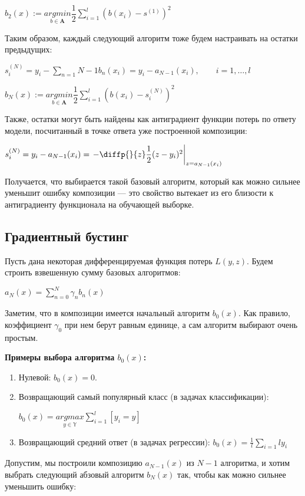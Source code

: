 \documentclass{article}
\begin{document}
$b_2(x) := \underset{b\in\mathbf{A}}{argmin} \dfrac{1}{2}\sum_{i=1}^{l}(b(x_i)-s^{(1)})^2$

Таким образом, каждый следующий алгоритм тоже будем настраивать на остатки предыдущих:

$s^{(N)}_i = y_i - \sum_{n=1}{N-1}b_n(x_i) = y_i - a_{N-1}(x_i),\qquad i=1,\ldots,l$

$b_N(x):= \underset{b\in\mathbf{A}}{argmin} \dfrac{1}{2}\sum_{i=1}^{l}(b(x_i)-s_i^{(N)})^2$

Также, остатки могут быть найдены как антиградиент функции потерь по ответу модели, посчитанный в точке ответа уже построенной композиции:

$s_i^{(N)} = y_i - a_{N-1}(x_i)= \left.- \diffp{}{z}\dfrac{1}{2}(z-y_i)^2\right|_{z=a_{N-1}(x_i)}$

Получается, что выбирается такой базовый алгоритм, который как можно сильнее уменьшит ошибку композиции — это свойство вытекает из его близости к антиградиенту функционала на обучающей выборке.

\subsection{Градиентный бустинг}

Пусть дана некоторая дифференцируемая функция потерь $L(y, z)$. Будем строить взвешенную сумму базовых алгоритмов:

$a_N(x) = \sum_{n=0}^{N}\gamma_n b_n(x)$

Заметим, что в композиции имеется начальный алгоритм $b_0(x)$. Как правило, коэффициент $\gamma_0$ при нем берут равным единице, а сам алгоритм выбирают очень простым.

\textbf{Примеры выбора алгоритма $b_0(x)$:}

\begin{enumerate}
	\item Нулевой: $b_0(x) = 0$.
	\item Возвращающий самый популярный класс (в задачах классификации):
	
	$b_0(x) = \underset{y\in\mathbf{\mathbb{Y}}}{argmax}\sum_{i=1}^{l}[y_i=y]$
	\item Возвращающий средний ответ (в задачах регрессии):	
	$b_0(x) = \frac{1}{l}\sum_{i=1}{l}y_i$
\end{enumerate}

Допустим, мы построили композицию $a_{N-1}(x)$ из $N-1$ алгоритма, и хотим выбрать следующий абзовый алгоритм $b_N(x)$ так, чтобы как можно сильнее уменьшить ошибку:
\end{document}
